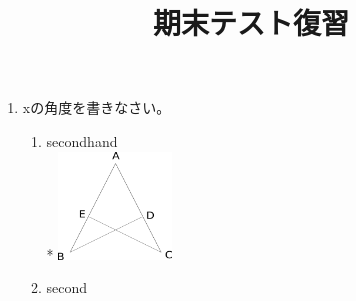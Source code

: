 \documentclass[dvipdfmx]{jsarticle}
\begin{document}
\title{期末テスト復習}
\begin{enumerate}
  \item xの角度を書きなさい。 
    \begin{enumerate}
      \item secondhand
        \vspace{0.2in} \\*
        \includegraphics[width=3cm]{g3857.png}
      \item second
    \end{enumerate}
  \end{enumerate}
\end{document}

